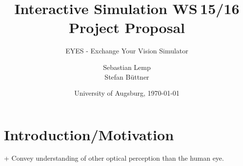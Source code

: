 \documentclass{acm_proc_article-sp}
\begin{document}
\title{
Interactive Simulation WS 15/16\\ %
Project Proposal
}
\subtitle{EYES - Exchange Your Vision Simulator}
\author{
\alignauthor
Sebastian Lemp\\
\alignauthor
Stefan Büttner\\
}

\date{University of Augsburg, \today}




\maketitle

\section{Introduction/Motivation}
+ Convey understanding of other optical perception than the human eye.
\end{document}
